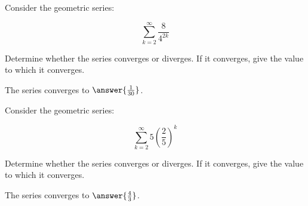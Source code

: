 \documentclass{ximera}
\author{Jim Talamo}
\begin{document}
\begin{exercise}
Consider the geometric series:

\[
\sum_{k=2}^{\infty} \frac{8}{4^{2k}}
\]

Determine whether the series converges or diverges.  If it converges, give the value to which it converges.

\begin{multipleChoice}
\end{multipleChoice}

\begin{exercise}
The series converges to $\answer{\frac{1}{30}}$.
\end{exercise}
\end{exercise}

\begin{exercise}
Consider the geometric series:

\[
\sum_{k=2}^{\infty} 5\left(\frac{2}{5}\right)^k
\]

Determine whether the series converges or diverges.  If it converges, give the value to which it converges.

\begin{multipleChoice}
\end{multipleChoice}

\begin{exercise}
The series converges to $\answer{\frac{4}{3}}$.
\end{exercise}
\end{exercise}
\end{document}

